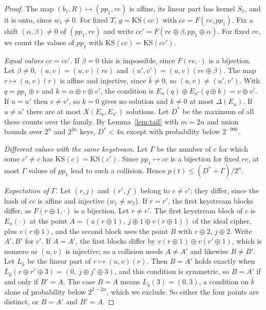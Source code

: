 \documentclass[11pt]{article}
\theoremstyle{definition}
\theoremstyle{remark}
\newcommand{\Dl}{\Delta}
\begin{document}
\begin{proof}
The map $(b_1,R)\mapsto(pp_1,re)$ is affine, its linear part has kernel $S_1$, and it is onto, since $w_1\ne0$. For fixed $T$, $g=\mathrm{KS}(cc)$ with $cc=F(re,pp_1)$. Fix a shift $(\alpha,\beta)\ne0$ of $(pp_1,re)$ and write $cc'=F(re\oplus\beta,pp_1\oplus\alpha)$. For fixed $re$, we count the values of $pp_1$ with $\mathrm{KS}(cc)=\mathrm{KS}(cc')$.

\emph{Equal values $cc=cc'$.} If $\beta=0$ this is impossible, since $F(re,\cdot)$ is a bijection. Let $\beta\ne0$, $(u,v)=(u,v)(re)$ and $(u',v')=(u,v)(re\oplus\beta)$. The map $r\mapsto(u,v)(r)$ is affine and injective, since $\bar k\ne0$, so $(u,v)\ne(u',v')$. With $q=pp_1\oplus v$ and $k=\alpha\oplus v\oplus v'$, the condition is $E_u(q)\oplus E_{u'}(q\oplus k)=v\oplus v'$. If $u=u'$ then $v\ne v'$, so $k=0$ gives no solution and $k\ne0$ at most $\Dl(E_u)$. If $u\ne u'$ there are at most $X(E_u,E_{u'})$ solutions. Let $D^\ast$ be the maximum of all these counts over the family. By Lemma~\ref{lem:tail} with $m=2n$ and union bounds over $2^n$ and $2^{2n}$ keys, $D^\ast<4n$ except with probability below $2^{-900}$.

\emph{Different values with the same keystream.} Let $\Gamma$ be the number of $c$ for which some $c'\ne c$ has $\mathrm{KS}(c)=\mathrm{KS}(c')$. Since $pp_1\mapsto cc$ is a bijection for fixed $re$, at most $\Gamma$ values of $pp_1$ lead to such a collision. Hence $p(t)\le(D^\ast+\Gamma)/2^n$.

\emph{Expectation of $\Gamma$.} Let $(r,j)$ and $(r',j')$ belong to $c\ne c'$; they differ, since the hash of $cc$ is affine and injective ($w_1\ne w_2$). If $r=r'$, the first keystream blocks differ, as $F(r\oplus1,\cdot)$ is a bijection. Let $r\ne r'$. The first keystream block of $c$ is $E_{u}(\cdot)$ at the point $A=(u(r\oplus1),\ j\oplus1\oplus v(r\oplus1))$ of the ideal cipher, plus $v(r\oplus1)$, and the second block uses the point $B$ with $r\oplus2$, $j\oplus2$. Write $A',B'$ for $c'$. If $A=A'$, the first blocks differ by $v(r\oplus1)\oplus v(r'\oplus1)$, which is nonzero as $(u,v)$ is injective; so a collision needs $A\ne A'$ and likewise $B\ne B'$. Let $L_{\bar k}$ be the linear part of $r\mapsto(u,v)(r)$. Then $B=A'$ holds exactly when $L_{\bar k}(r\oplus r'\oplus3)=(0,\ j\oplus j'\oplus3)$, and this condition is symmetric, so $B=A'$ if and only if $B'=A$. The case $B=A$ means $L_{\bar k}(3)=(0,3)$, a condition on $\bar k$ alone of probability below $2^{2-2n}$, which we exclude. So either the four points are distinct, or $B=A'$ and $B'=A$.


\end{proof}
\end{document}
